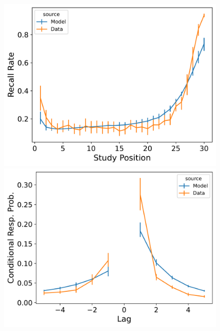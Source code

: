 \documentclass[
  letterpaper,
  11pt,
  english,
  singlespacing,
  headsepline]{MastersDoctoralThesis}
\begin{document}
\begin{figure}
\begin{minipage}{0.33\linewidth}
\includegraphics{icmr_figures/Murdock1962_TraceScalingCMR_Model_Fitting_LL30_spc-1.png}\end{minipage}%
\newline
\begin{minipage}{0.33\linewidth}
\includegraphics{icmr_figures/Murdock1962_MultiScalingCMR_Model_Fitting_LL30_crp-1.png}\end{minipage}%
%
\begin{minipage}{0.33\linewidth}

\end{minipage}
\end{figure}
\end{document}
